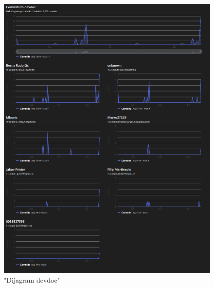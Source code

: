		\begin{figure}[H]
			\centering
			\includegraphics[scale=0.5]{./slike/devdoc.png}
			\caption{"Dijagram devdoc"}
			\label{fig:devdoc}
		\end{figure}
		
	